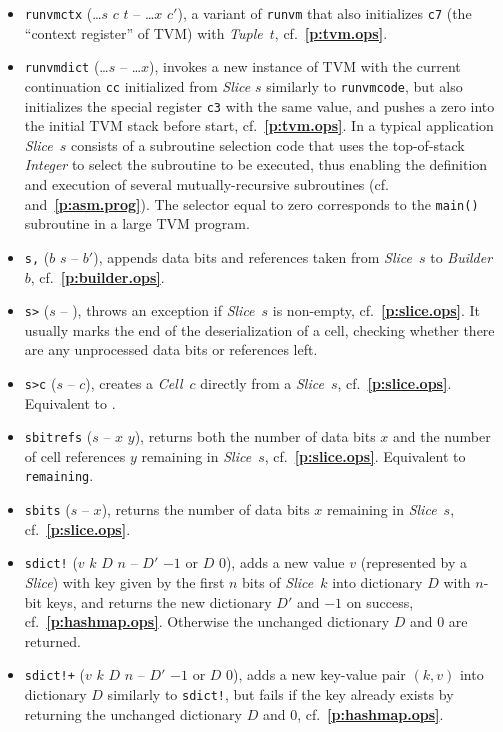 \documentclass[12pt,oneside]{article}
\def\refpoint#1{{\rm\textbf{\ref{#1}}}}
\let\ptref=\refpoint
\begin{document}
\begin{itemize}
\item {\tt runvmctx} (\dots $s$ $c$ $t$ -- \dots $x$ $c'$), a variant of {\tt runvm} that also initializes {\tt c7} (the ``context register'' of TVM) with {\em Tuple\/}~$t$, cf.~\ptref{p:tvm.ops}.
\item {\tt runvmdict} (\dots $s$ -- \dots $x$), invokes a new instance of TVM with the current continuation {\tt cc} initialized from {\em Slice\/} $s$ similarly to {\tt runvmcode}, but also initializes the special register {\tt c3} with the same value, and pushes a zero into the initial TVM stack before start, cf.~\ptref{p:tvm.ops}. In a typical application {\em Slice\/}~$s$ consists of a subroutine selection code that uses the top-of-stack {\em Integer\/} to select the subroutine to be executed, thus enabling the definition and execution of several mutually-recursive subroutines (cf.~\cite[4.6]{TVM} and~\ptref{p:asm.prog}). The selector equal to zero corresponds to the {\tt main()} subroutine in a large TVM program.
\item {\tt s,} ($b$ $s$ -- $b'$), appends data bits and references taken from {\em Slice}~$s$ to {\em Builder}~$b$, cf.~\ptref{p:builder.ops}.
\item {\tt s>} ($s$ -- ), throws an exception if {\em Slice\/}~$s$ is non-empty, cf.~\ptref{p:slice.ops}. It usually marks the end of the deserialization of a cell, checking whether there are any unprocessed data bits or references left.
\item {\tt s>c} ($s$ -- $c$), creates a {\em Cell}~$c$ directly from a {\em Slice}~$s$, cf.~\ptref{p:slice.ops}. Equivalent to {\tt <b swap s, b>}.
\item {\tt sbitrefs} ($s$ -- $x$ $y$), returns both the number of data bits $x$ and the number of cell references $y$ remaining in {\em Slice}~$s$, cf.~\ptref{p:slice.ops}. Equivalent to {\tt remaining}.
\item {\tt sbits} ($s$ -- $x$), returns the number of data bits $x$ remaining in {\em Slice}~$s$, cf.~\ptref{p:slice.ops}.
\item {\tt sdict!} ($v$ $k$ $D$ $n$ -- $D'$ $-1$ or $D$ $0$), adds a new value $v$ (represented by a {\em Slice\/}) with key given by the first $n$ bits of {\em Slice\/}~$k$ into dictionary $D$ with $n$-bit keys, and returns the new dictionary $D'$ and $-1$ on success, cf.~\ptref{p:hashmap.ops}. Otherwise the unchanged dictionary $D$ and $0$ are returned.
\item {\tt sdict!+} ($v$ $k$ $D$ $n$ -- $D'$ $-1$ or $D$ $0$), adds a new key-value pair $(k,v)$ into dictionary $D$ similarly to {\tt sdict!}, but fails if the key already exists by returning the unchanged dictionary $D$ and $0$, cf.~\ptref{p:hashmap.ops}.

\end{itemize}
\end{document}
